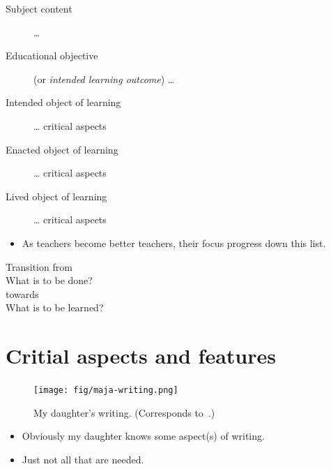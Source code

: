 \begin{frame}
  \begin{example}
    \begin{description}
      \item[Subject content] \dots
      \item[Educational objective] (or \emph{intended learning outcome}) \dots
      \item[Intended object of learning] \dots
        critical aspects
      \item[Enacted object of learning] \dots
        critical aspects
      \item[Lived object of learning] \dots
        critical aspects
    \end{description}
  \end{example}

  \begin{remark}
    \begin{itemize}
      \item As teachers become better teachers, their focus progress down this 
        list.
    \end{itemize}
  \end{remark}
\end{frame}

\begin{frame}
  \begin{center}
    Transition from\\[0.5em]
    What is to be done?\\[0.5em]
    towards\\[0.5em]
    What is to be learned?
  \end{center}
\end{frame}

\section{Critial aspects and features}

\begin{frame}
  \begin{figure}
    \texttt{[image: fig/maja-writing.png]}
    \caption{My daughter's writing. (Corresponds to~\cite[Fig.~2.1, 
    p.~30]{NecessaryConditionsOfLearning}.)}
  \end{figure}
  \begin{example}
    \begin{itemize}
      \item Obviously my daughter knows some aspect(s) of writing.
      \item Just not all that are needed.
    \end{itemize}
  \end{example}
\end{frame}

